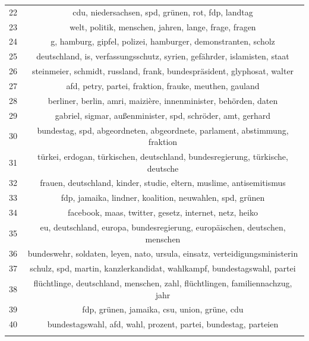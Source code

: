 \documentclass[
  12pt,
]{article}
\begin{document}
\begin{table}[!htbp]
\begin{tabular}{@{\extracolsep{5pt}} cc}
22 & cdu, niedersachsen, spd, grünen, rot, fdp, landtag \\ 
23 & welt, politik, menschen, jahren, lange, frage, fragen \\ 
24 & g, hamburg, gipfel, polizei, hamburger, demonstranten, scholz \\ 
25 & deutschland, is, verfassungsschutz, syrien, gefährder, islamisten, staat \\ 
26 & steinmeier, schmidt, russland, frank, bundespräsident, glyphosat, walter \\ 
27 & afd, petry, partei, fraktion, frauke, meuthen, gauland \\ 
28 & berliner, berlin, amri, maizière, innenminister, behörden, daten \\ 
29 & gabriel, sigmar, außenminister, spd, schröder, amt, gerhard \\ 
30 & bundestag, spd, abgeordneten, abgeordnete, parlament, abstimmung, fraktion \\ 
31 & türkei, erdogan, türkischen, deutschland, bundesregierung, türkische, deutsche \\ 
32 & frauen, deutschland, kinder, studie, eltern, muslime, antisemitismus \\ 
33 & fdp, jamaika, lindner, koalition, neuwahlen, spd, grünen \\ 
34 & facebook, maas, twitter, gesetz, internet, netz, heiko \\ 
35 & eu, deutschland, europa, bundesregierung, europäischen, deutschen, menschen \\ 
36 & bundeswehr, soldaten, leyen, nato, ursula, einsatz, verteidigungsministerin \\ 
37 & schulz, spd, martin, kanzlerkandidat, wahlkampf, bundestagswahl, partei \\ 
38 & flüchtlinge, deutschland, menschen, zahl, flüchtlingen, familiennachzug, jahr \\ 
39 & fdp, grünen, jamaika, csu, union, grüne, cdu \\ 
40 & bundestagswahl, afd, wahl, prozent, partei, bundestag, parteien \\ 
\hline \\[-1.8ex] 
\end{tabular} 
\end{table}
\end{document}
